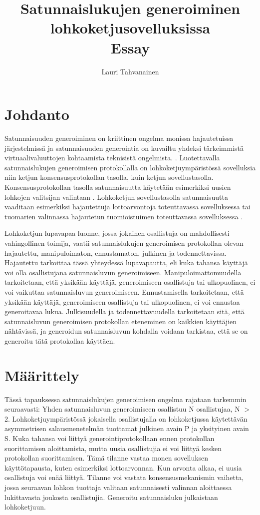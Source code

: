 \documentclass{article}
\title{ Satunnaislukujen generoiminen lohkoketjusovelluksissa \\\small{Essay}}
\author{Lauri Tahvanainen}
\begin{document}
\maketitle

\section{Johdanto}

Satunnaisuuden generoiminen on kriittinen ongelma monissa hajautetuissa järjestelmissä ja satunnaisuuden generointia on kuvailtu yhdeksi tärkeimmistä virtuaalivaluuttojen kohtaamista teknisistä ongelmista. \cite{noauthor_hpoc_2015_nodate}. Luotettavalla satunnaislukujen generoimisen protokollalla on lohkoketjuympäristössä sovelluksia niin ketjun konsensusprotokollan tasolla, kuin ketjun sovellustasolla. Konsensusprotokollan tasolla satunnaisuutta käytetään esimerkiksi uusien lohkojen valitsijan valintaan \cite{chen_algorand_2017}. Lohkoketjun sovellustasolla satunnaisuutta vaaditaan esimerkiksi hajautettuja lottoarvontoja toteuttavassa sovelluksessa \cite{pooltogether_pooltogether_nodate} tai tuomarien valinnassa hajautetun tuomioistuimen toteuttavassa sovelluksessa \cite{lesaege_kleros_2020}. 

Lohkoketjun lupavapaa luonne, jossa jokainen osallistuja on mahdollisesti vahingollinen toimija, vaatii satunnaislukujen generoimisen protokollan olevan hajautettu, manipuloimaton, ennustamaton, julkinen ja todennettavissa. Hajautettu tarkoittaa tässä yhteydessä lupavapautta, eli kuka tahansa käyttäjä voi olla osallistujana satunnaisluvun generoimiseen. Manipuloimattomuudella tarkoitetaan, että yksikään käyttäjä, generoimiseen osallistuja tai ulkopuolinen, ei voi vaikuttaa satunnaisluvun generoimiseen. Ennustamisella tarkoitetaan, että yksikään käyttäjä, generoimiseen osallistuja tai ulkopuolinen, ei voi ennustaa generoitavaa lukua. Julkisuudella ja todennettavuudella tarkoitetaan sitä, että satunnaisluvun generoimisen protokollan eteneminen on kaikkien käyttäjien nähtävissä, ja generoidun satunnaisluvun kohdalla voidaan tarkistaa, että se on generoitu tätä protokollaa käyttäen.

\section{Määrittely}

Tässä tapauksessa satunnaislukujen generoimisen ongelma rajataan tarkemmin seuraavasti:
Yhden satunnaisluvun generoimiseen osallistuu N osallistujaa,  N $>$ 2. Lohkoketjuympäristössä jokaisella osallistujalla on lohkoketjussa käytettävän asymmetrisen salausmenetelmän tuottamat julkinen avain P ja yksityinen avain S. Kuka tahansa voi liittyä generointiprotokollaan ennen protokollan suorittamisen aloittamista, mutta uusia osallistujia ei voi liittyä kesken protokollan suorittamisen. Tämä tilanne vastaa monen sovelluksen käyttötapausta, kuten esimerkiksi lottoarvonnan. Kun arvonta alkaa, ei uusia osallistuja voi enää liittyä. Tilanne voi vastata konsensusmekanismin vaihetta, jossa seuraavan lohkon tuottaja valitaan satunnaisesti valinnan aloittaessa lukittavasta joukosta osallistujia. Generoitu satunnaisluku julkaistaan lohkoketjuun. 
\end{document}
